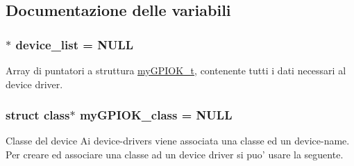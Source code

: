 \subsection{Documentazione delle variabili}
\hypertarget{group___linux-_driver_ga1deed297d5c8afeb9703965d37d3be5b}{
\subsubsection[{device\+\_\+list}]{$\ast$ device\+\_\+list = N\+U\+L\+L\hspace{0.3cm}{\ttfamily [static]}}}\label{group___linux-_driver_ga1deed297d5c8afeb9703965d37d3be5b}


Array di puntatori a struttura \hyperlink{structmy_g_p_i_o_k__t}{my\+G\+P\+I\+O\+K\+\_\+t}, contenente tutti i dati necessari al device driver. 

\hypertarget{group___linux-_driver_gaaf8d1bce7d6389684a037e94381c275c}{
\subsubsection[{my\+G\+P\+I\+O\+K\+\_\+class}]{\setlength{\rightskip}{0pt plus 5cm}struct class$\ast$ my\+G\+P\+I\+O\+K\+\_\+class = N\+U\+L\+L\hspace{0.3cm}{\ttfamily [static]}}}\label{group___linux-_driver_gaaf8d1bce7d6389684a037e94381c275c}


Classe del device Ai device-\/drivers viene associata una classe ed un device-\/name. Per creare ed associare una classe ad un device driver si puo' usare la seguente. 



